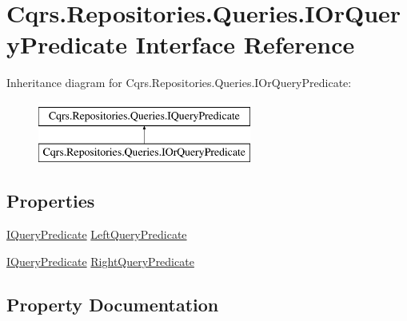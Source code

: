 \hypertarget{interfaceCqrs_1_1Repositories_1_1Queries_1_1IOrQueryPredicate}{}\section{Cqrs.\+Repositories.\+Queries.\+I\+Or\+Query\+Predicate Interface Reference}
\label{interfaceCqrs_1_1Repositories_1_1Queries_1_1IOrQueryPredicate}
Inheritance diagram for Cqrs.\+Repositories.\+Queries.\+I\+Or\+Query\+Predicate\+:\begin{figure}[H]
\begin{center}
\leavevmode
\includegraphics[height=2.000000cm]{interfaceCqrs_1_1Repositories_1_1Queries_1_1IOrQueryPredicate}
\end{center}
\end{figure}
\subsection*{Properties}
\begin{DoxyCompactItemize}
\item 
\hyperlink{interfaceCqrs_1_1Repositories_1_1Queries_1_1IQueryPredicate}{I\+Query\+Predicate} \hyperlink{interfaceCqrs_1_1Repositories_1_1Queries_1_1IOrQueryPredicate_a714d125899714f5aabc2d50e4ffb9834}{Left\+Query\+Predicate}
\item 
\hyperlink{interfaceCqrs_1_1Repositories_1_1Queries_1_1IQueryPredicate}{I\+Query\+Predicate} \hyperlink{interfaceCqrs_1_1Repositories_1_1Queries_1_1IOrQueryPredicate_a72ad26892989a09527ead9a2ecce5d47}{Right\+Query\+Predicate}
\end{DoxyCompactItemize}


\subsection{Property Documentation}
\mbox{\label{interfaceCqrs_1_1Repositories_1_1Queries_1_1IOrQueryPredicate_a714d125899714f5aabc2d50e4ffb9834}} 
